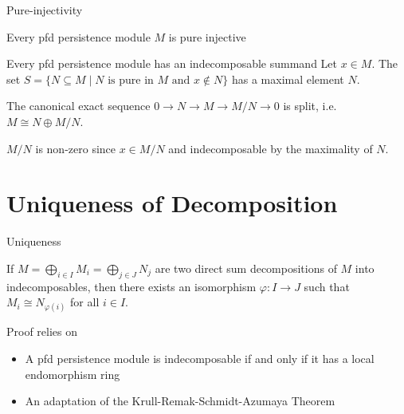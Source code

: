 \documentclass{beamer}
\begin{document}
    \begin{frame}{Pure-injectivity}
        \begin{lemma}
            Every pfd persistence module $M$ is pure injective
        \end{lemma}
    \end{frame}

    \begin{frame}{Every pfd persistence module has an indecomposable summand}
        Let $x\in M$. The set $S=\{N\subseteq M\mid N\text{ is pure in }M\text{ and }x\not\in N\}$ has a maximal element $N$.\pause
        
        The canonical exact sequence $0\to N\to M\to M/N\to 0$ is split, i.e. $M\cong N\oplus M/N$.\pause
        
        $M/N$ is non-zero since $x\in M/N$ and indecomposable by the maximality of $N$.
    \end{frame}


    \section{Uniqueness of Decomposition}
    \begin{frame}{Uniqueness}
         \begin{theorem}
            If $M=\bigoplus_{i\in I}M_i=\bigoplus_{j\in J}N_j$ are two direct sum decompositions of $M$ into indecomposables, then there exists an isomorphism $\varphi\colon I\to J$ such that $M_i\cong N_{\varphi(i)}$ for all $i\in I$.
        \end{theorem}\pause
        Proof relies on
        \begin{itemize}
            \item A pfd persistence module is indecomposable if and only if it has a local endomorphism ring\pause
            \item An adaptation of the Krull-Remak-Schmidt-Azumaya Theorem
        \end{itemize}
    \end{frame}

    




        
\end{document}
